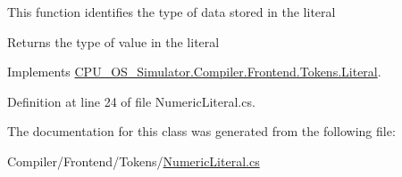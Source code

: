 This function identifies the type of data stored in the literal 

\begin{DoxyReturn}{Returns}
the type of value in the literal
\end{DoxyReturn}


Implements \hyperlink{class_c_p_u___o_s___simulator_1_1_compiler_1_1_frontend_1_1_tokens_1_1_literal_a34d05c00ded660daf66f91bd2543d186}{C\+P\+U\+\_\+\+O\+S\+\_\+\+Simulator.\+Compiler.\+Frontend.\+Tokens.\+Literal}.



Definition at line 24 of file Numeric\+Literal.\+cs.



The documentation for this class was generated from the following file\+:\begin{DoxyCompactItemize}
\item 
Compiler/\+Frontend/\+Tokens/\hyperlink{_numeric_literal_8cs}{Numeric\+Literal.\+cs}\end{DoxyCompactItemize}

